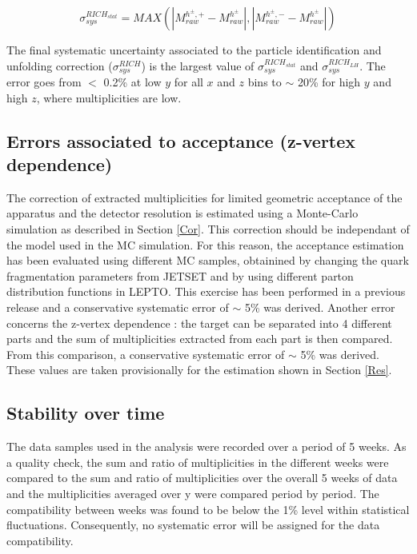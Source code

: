 \documentclass[letterpaper,12pt]{article}
\begin{document}
\begin{equation}
  \sigma^{RICH_{stat}}_{sys} = MAX(|M^{h^{\pm},+}_{raw}-M^{h^{\pm}}_{raw}|,|M^{h^{\pm},-}_{raw}-M^{h^{\pm}}_{raw}|)
\end{equation}

The final systematic uncertainty associated to the particle identification and unfolding correction ($\sigma^{RICH}_{sys}$) is the largest value of $\sigma^{RICH_{stat}}_{sys}$ and $\sigma^{RICH_{LH}}_{sys}$. The error goes from $<$ 0.2\% at low $y$ for all $x$ and $z$ bins to $\sim$ 20\% for high $y$ and high $z$, where multiplicities are low.



\subsection{Errors associated to acceptance (z-vertex dependence)}

The correction of extracted multiplicities for limited geometric acceptance of the apparatus and the detector resolution is estimated using a Monte-Carlo simulation as described in Section \ref{Cor}. This correction should be independant of the model used in the MC simulation. For this reason, the acceptance estimation has been evaluated using different MC samples, obtainined by changing the quark fragmentation parameters from JETSET and by using different parton distribution functions in LEPTO. This exercise has been performed in a previous release \cite{Release2015} and a conservative systematic error of $\sim$ 5\% was derived.
Another error concerns the z-vertex dependence : the target can be separated into 4 different parts and the sum of multiplicities extracted from each part is then compared. From this comparison, a conservative systematic error of $\sim$ 5\% was derived.
These values are taken provisionally for the estimation shown in Section \ref{Res}.

\subsection{Stability over time}

The data samples used in the analysis were recorded over a period of 5 weeks. As a quality check, the sum and ratio of multiplicities in the different weeks were compared to the sum and ratio of multiplicities over the overall 5 weeks of data and the multiplicities averaged over y were compared period by period. The compatibility between weeks was found to be below the 1\% level within statistical fluctuations. Consequently, no systematic error will be assigned for the data compatibility.
\end{document}
